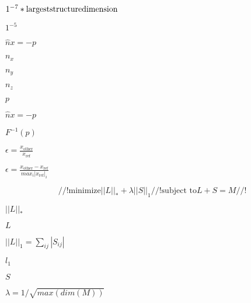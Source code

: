 \documentclass{article}
\begin{document}
$1^{-7}*\rm{largest structure dimension}$
\pagebreak

$1^{-5}$
\pagebreak

$\hat{n}x = -p$
\pagebreak

$n_x$
\pagebreak

$n_y$
\pagebreak

$n_z$
\pagebreak

$p$
\pagebreak

$\hat{n}x = -p $
\pagebreak

$ F^{-1}(p) $
\pagebreak

$ \epsilon = \frac{x_{\mbox{other}}}{x_{\mbox{ref}}} $
\pagebreak

$ \epsilon = \frac{x_{\mbox{other}}-x_{\mbox{ref}}}{max_i |x_{\mbox{ref}}|_i } $
\pagebreak

\[ //! \text{minimize} ||L||_* + \lambda ||S||_1 //! \text{subject to} L + S = M //! \]
\pagebreak

$ ||L||_* $
\pagebreak

$ L $
\pagebreak

$ ||L||_1 = \sum_{ij}|S_{ij}| $
\pagebreak

$ l_1 $
\pagebreak

$ S $
\pagebreak

$ \lambda = 1/\sqrt{max(dim(M))}$
\pagebreak
\end{document}
